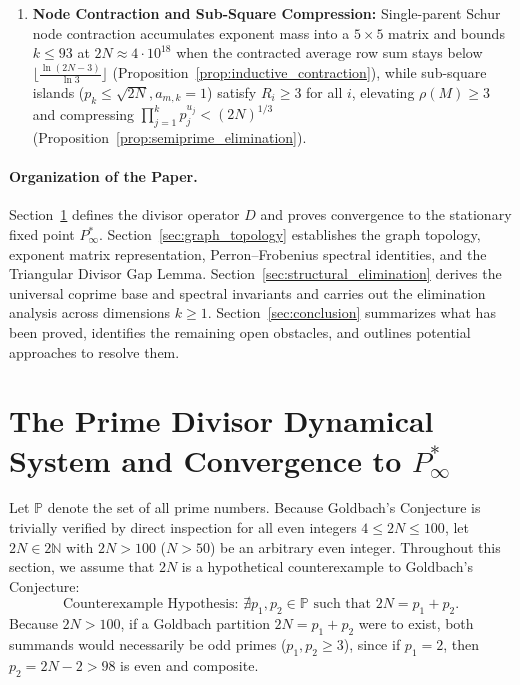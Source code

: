 \documentclass[11pt,a4paper]{article}
\theoremstyle{definition}
\begin{document}
\begin{enumerate}
    \item \textbf{Node Contraction and Sub-Square Compression:} Single-parent Schur node contraction accumulates exponent mass into a $5 \times 5$ matrix and bounds $k \le 93$ at $2N \approx 4 \cdot 10^{18}$ when the contracted average row sum stays below $\lfloor \frac{\ln(2N-3)}{\ln 3} \rfloor$ (Proposition~\ref{prop:inductive_contraction}), while sub-square islands ($p_k \le \sqrt{2N}, a_{m,k} = 1$) satisfy $R_i \ge 3$ for all $i$, elevating $\rho(M) \ge 3$ and compressing $\prod_{j=1}^k p_j^{u_j} < (2N)^{1/3}$ (Proposition~\ref{prop:semiprime_elimination}).
\end{enumerate}

\paragraph{Organization of the Paper.}
Section~\ref{sec:dynamical_system} defines the divisor operator $D$ and proves convergence to the stationary fixed point $P^*_\infty$. Section~\ref{sec:graph_topology} establishes the graph topology, exponent matrix representation, Perron--Frobenius spectral identities, and the Triangular Divisor Gap Lemma. Section~\ref{sec:structural_elimination} derives the universal coprime base and spectral invariants and carries out the elimination analysis across dimensions $k \ge 1$. Section~\ref{sec:conclusion} summarizes what has been proved, identifies the remaining open obstacles, and outlines potential approaches to resolve them.

\section{The Prime Divisor Dynamical System and Convergence to \texorpdfstring{$P^*_\infty$}{P*\_infinity}}
\label{sec:dynamical_system}

Let $\mathbb{P}$ denote the set of all prime numbers. Because Goldbach's Conjecture is trivially verified by direct inspection for all even integers $4 \le 2N \le 100$, let $2N \in 2\mathbb{N}$ with $2N > 100$ ($N > 50$) be an arbitrary even integer. Throughout this section, we assume that $2N$ is a hypothetical counterexample to Goldbach's Conjecture:
\[
\text{Counterexample Hypothesis: } \nexists p_1, p_2 \in \mathbb{P} \text{ such that } 2N = p_1 + p_2.
\]
Because $2N > 100$, if a Goldbach partition $2N = p_1 + p_2$ were to exist, both summands would necessarily be odd primes ($p_1, p_2 \ge 3$), since if $p_1 = 2$, then $p_2 = 2N - 2 > 98$ is even and composite.
\end{document}
